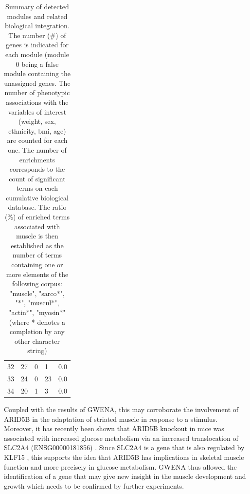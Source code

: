 \begin{table}[H]
\begin{tabular}{lllll}
32              & 27                & 0                        & 1                      & 0.0                        \\
33              & 24                & 0                        & 23                     & 0.0                        \\
34              & 20                & 1                        & 3                      & 0.0                       
\end{tabular}
\caption[Summary of detected modules and related biological integration]{Summary of detected modules and related biological integration. The number (\#) of genes is indicated for each module (module 0 being a false module containing the unassigned genes. The number of phenotypic associations with the variables of interest (weight, sex, ethnicity, bmi, age) are counted for each one. The number of enrichments corresponds to the count of significant terms on each cumulative biological database. The ratio (\%) of enriched terms associated with muscle is then established as the number of terms containing one or more elements of the following corpus: "muscle", "sarco*", "*", "muscul*", "actin*", "myosin*" (where * denotes a completion by any other character string)
}
\label{table:mod_young_bio_integration_summary}
\end{table}



 Coupled with the results of GWENA, this may corroborate the involvement of ARID5B in the adaptation of striated muscle in response to a stimulus. Moreover, it has recently been shown that ARID5B knockout in mice was associated with increased glucose metabolism via an increased translocation of SLC2A4 (ENSG00000181856) . Since SLC2A4 is a gene that is also regulated by KLF15 , this supports the idea that ARID5B has implications in skeletal muscle function and more precisely in glucose metabolism. GWENA thus allowed the identification of a gene that may give new insight in the muscle development and growth which needs to be confirmed by further experiments.

